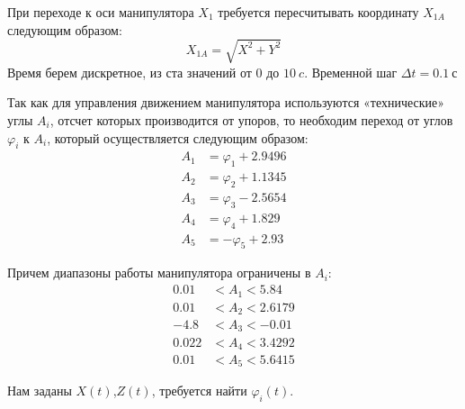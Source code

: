 При переходе к оси манипулятора $X_{1}$ требуется пересчитывать координату $X_{1A}$ следующим образом:
$$X_{1A}=\sqrt{X^2+Y^2}$$ 
Время берем дискретное, из ста значений от $0$ до $10 \: c$. Временной шаг $ \Delta t = 0.1 \: с $

Так как для управления движением манипулятора используются «технические» углы $A_i$, отсчет которых производится от упоров, то необходим переход от углов $\varphi_i$ к $A_i$, который осуществляется следующим образом:
\begin{align*}
    A_1 &= \varphi_1+2.9496 \\
    A_2 &= \varphi_2+1.1345 \\
    A_3 &= \varphi_3-2.5654 \\
    A_4 &= \varphi_4+1.829 \\
    A_5 &= -\varphi_5+2.93 
\end{align*}

Причем диапазоны работы манипулятора ограничены в $A_i$:
\begin{align*}
   0.01 &< A_1 < 5.84 \\
   0.01 &< A_2 < 2.6179 \\
   -4.8 &< A_3 < -0.01 \\
   0.022 &< A_4 < 3.4292 \\
   0.01 &< A_5 < 5.6415 
\end{align*}

Нам заданы $X(t)$,$Z(t)$, требуется найти $\varphi_i (t)$.